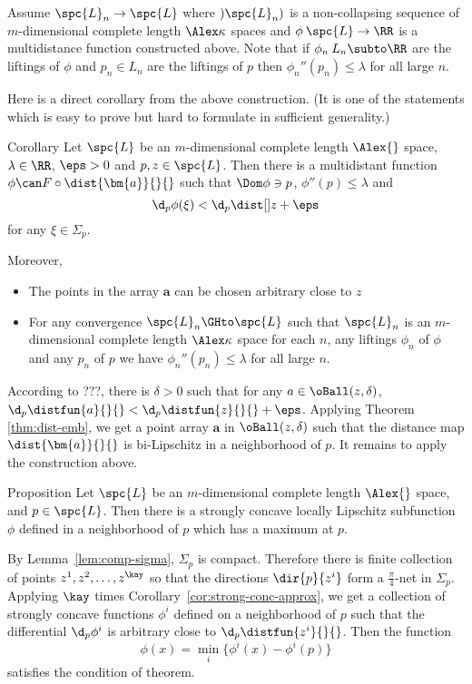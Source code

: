 Assume $\spc{L}_n\to\spc{L}$ where $)\spc{L}_n)$ is a non-collapsing sequence of $m$-dimensional complete length $\Alex\kappa$ spaces
and $\phi\:\spc{L}\to \RR$ 
is a multidistance function constructed above. 
Note that if $\phi_n\:{L}_n\subto\RR$ are the liftings of $\phi$ and $p_n\in{L}_n$ are the liftings of $p$
then $\phi_n''(p_n)\le\lambda$ for all large $n$.
\qeds

Here is a direct corollary from the above construction.
(It is one of the statements which is easy to prove but hard to formulate in sufficient generality.)

\begin{thm}{Corollary}%
\label{cor:strong-conc-approx}
Let $\spc{L}$ be an $m$-dimensional complete length $\Alex{}$ space, 
$\lambda\in\RR$,
$\eps>0$
and $p,z\in \spc{L}$.
Then there is a multidistant function 
$\phi\can F\circ\dist{\bm{a}}{}{}$
such that $\Dom\phi\ni p$,
$\phi''(p)\le\lambda$ and
$$\d_p\phi(\xi)<\d_p\dist[{{}}]{z}{}{}+\eps$$
for any $\xi\in\Sigma_p$.

Moreover, 
\begin{itemize}
 \item The points in the array $\bm{a}$ can be chosen arbitrary close to $z$
 \item For any convergence $\spc{L}_n\GHto\spc{L}$
such that
$\spc{L}_n$ is an $m$-dimensional complete length $\Alex\kappa$ space for each $n$,
any liftings $\phi_n$ of $\phi$ and 
any $p_n$ of $p$ we have
$\phi_n''(p_n)\le\lambda$ for all large $n$.
\end{itemize}
\end{thm}

According to ???,
there is $\delta>0$ such that for any $a\in \oBall(z,\delta)$,
$\d_p\distfun{a}{}{}<\d_p\distfun{z}{}{}+\eps$.
Applying Theorem \ref{thm:dist-emb},
we get a point array $\bm{a}$ in $\oBall(z,\delta)$ such that
the distance map $\dist{\bm{a}}{}{}$ is bi-Lipschitz in a neighborhood of $p$.
It remains to apply the construction above.
\qeds


\begin{thm}{Proposition}\label{prop:convex-function}
Let $\spc{L}$ be an $m$-dimensional complete length $\Alex{}$ space, 
and $p\in\spc{L}$.
Then there is a strongly concave locally Lipschitz subfunction $\phi$
defined in a neighborhood of $p$ which has a maximum at $p$.
\end{thm}

By Lemma~\ref{lem:comp-sigma}, $\Sigma_p$ is compact.
Therefore there is finite collection of points $z^1,z^2,\dots,z^\kay$
so that the directions $\dir{p}{z^i}$ form a $\tfrac\pi4$-net in $\Sigma_p$.
Applying $\kay$ times Corollary~\ref{cor:strong-conc-approx},
we get a collection of strongly concave functions $\phi^i$ 
defined on a neighborhood of $p$
such that the differential $\d_p\phi^i$ is arbitrary close to $\d_p\distfun{z^i}{}{}$.
Then the function 
\[\phi(x)=\min_i\{\phi^i(x)-\phi^i(p)\}\]
satisfies the condition of theorem.

